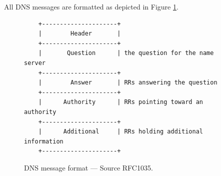 \documentclass[pdftex,12pt,a4paper]{article}
\begin{document}
            All DNS messages are formatted as depicted in Figure \ref{fig:gen}.
            \begin{figure}[!htb]
                \centering
            \begin{verbatim}    +---------------------+
    |        Header       |
    +---------------------+
    |       Question      | the question for the name server
    +---------------------+
    |        Answer       | RRs answering the question
    +---------------------+
    |      Authority      | RRs pointing toward an authority
    +---------------------+
    |      Additional     | RRs holding additional information
    +---------------------+\end{verbatim}
                \caption{DNS message format --- Source RFC1035.}
                \label{fig:gen}
            \end{figure}
\end{document}
